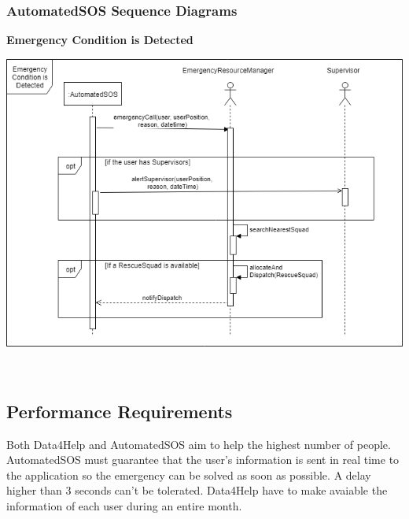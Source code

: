 {\color{Blue}\subsubsection{AutomatedSOS Sequence Diagrams}}

\textbf{Emergency Condition is Detected}\par
\begin{center}
	\includegraphics[scale=0.6]{Images/UML/EmergencyConditionsSeq.png}
\end{center}










\
{\color{Blue}\subsection{Performance Requirements}}

Both Data4Help and AutomatedSOS aim to help the highest number of people. AutomatedSOS must guarantee that the user's information is sent in real time to the application so the emergency can be solved as soon as possible. A delay higher than 3 seconds can’t be tolerated. Data4Help have to make avaiable the information of each user during an entire month.
